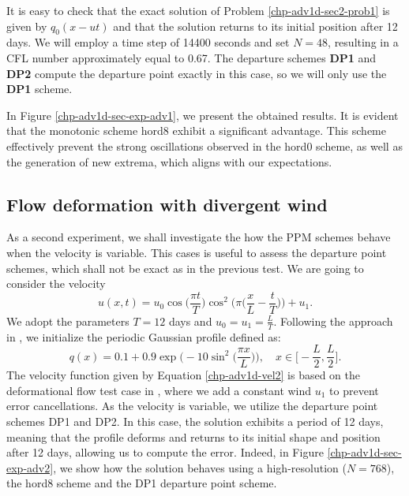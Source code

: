 It is easy to check that the exact solution of Problem \ref{chp-adv1d-sec2-prob1} is given
by $q_0(x-ut)$ and that the solution returns to its initial position after 12 days.
We will employ a time step of 14400 seconds and set $N=48$, resulting in a CFL number approximately equal to 0.67.
The departure schemes \textbf{DP1} and \textbf{DP2} compute the departure point exactly in this case, so we will only use the \textbf{DP1} scheme.

In Figure \ref{chp-adv1d-sec-exp-adv1}, we present the obtained results.
It is evident that the monotonic scheme hord8 exhibit a significant advantage.
This scheme effectively prevent the strong oscillations observed in the hord0 scheme,
as well as the generation of new extrema, which aligns with our expectations.

\subsection{Flow deformation with divergent wind}
\label{chp-adv1d-sec-numerical-exp-2}
As a second experiment, we shall investigate the how the PPM schemes behave when the velocity
is variable.
This cases is useful to assess the departure point schemes, which shall not be exact as in the previous test.
We are going to consider the velocity
\begin{equation}
	\label{chp-adv1d-vel2}
	u(x,t) = u_0\cos{\bigg(\frac{\pi t}{T}\bigg)}\cos^2\bigg(\pi \bigg(\frac{x}{L}-\frac{t}{T}\bigg)\bigg) + u_1.
\end{equation}
We adopt the parameters $T = 12$ days and  $u_0 = u_1 = \frac{L}{T}$.
Following the approach in \citet{trefethen:2000}, we initialize the periodic Gaussian profile defined as:
\begin{equation}
	\label{chp-adv1d-ic2}
	q(x) = 0.1 + 0.9\exp\bigg(-10\sin^2{\bigg(\frac{\pi x}{L}\bigg)}\bigg),\quad x \in \bigg[-\frac{L}{2},\frac{L}{2}\bigg].
\end{equation}
The velocity function given by Equation \eqref{chp-adv1d-vel2} is based
on the deformational flow test case in \citet{nair:2010},
where we add a constant wind $u_1$ to prevent error cancellations.
As the velocity is variable, we utilize the departure point schemes DP1 and DP2.
In this case, the solution exhibits a period of 12 days,
meaning that the profile deforms and returns to its initial shape
and position after 12 days, allowing us to compute the error.
Indeed, in Figure \ref{chp-adv1d-sec-exp-adv2}, we show how the solution behaves
using a high-resolution ($N=768$), the hord8 scheme and the DP1 departure point scheme.
